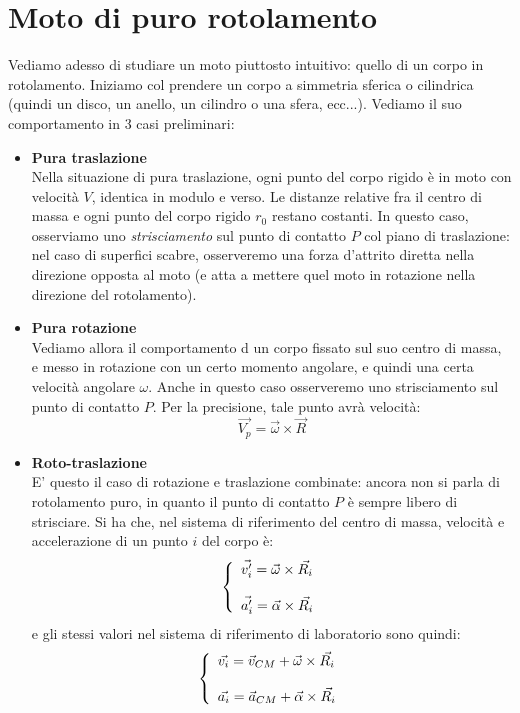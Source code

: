 \documentclass[a4paper,12pt]{article}
\begin{document}
\section{Moto di puro rotolamento}
Vediamo adesso di studiare un moto piuttosto intuitivo: quello di un corpo in rotolamento. Iniziamo col prendere un corpo a simmetria sferica o cilindrica (quindi un disco, un anello, un cilindro o una sfera, ecc...). Vediamo il suo comportamento in 3 casi preliminari:
\begin{itemize}
  \item \textbf{Pura traslazione} \\
    Nella situazione di pura traslazione, ogni punto del corpo rigido è in moto con velocità $V$, identica in modulo e verso. Le distanze relative fra il centro di massa e ogni punto del corpo rigido $r_0$ restano costanti. In questo caso,
    osserviamo uno \textit{strisciamento} sul punto di contatto $P$ col piano di traslazione: nel caso di superfici scabre, osserveremo una forza d'attrito diretta nella direzione opposta al moto (e atta a mettere quel moto in rotazione nella direzione del rotolamento).
  \item \textbf{Pura rotazione} \\
    Vediamo allora il comportamento d un corpo fissato sul suo centro di massa, e messo in rotazione con un certo momento angolare, e quindi una certa velocità angolare $\omega$. Anche in questo caso osserveremo uno strisciamento sul punto di contatto $P$. Per la precisione,
    tale punto avrà velocità:
    $$ \vec{V_p} = \vec{\omega} \times \vec{R} $$
  \item \textbf{Roto-traslazione} \\
    E' questo il caso di rotazione e traslazione combinate: ancora non si parla di rotolamento puro, in quanto il punto di contatto $P$ è sempre libero di strisciare. Si ha che, nel sistema di riferimento del centro di massa,
    velocità e accelerazione di un punto $i$ del corpo è:
    $$ 
    \left\{\begin{array}{l}
        \vec{v'_i} = \vec{\omega} \times \vec{R_i} \cr \\ 
        \vec{a'_i} = \vec{\alpha} \times \vec{R_i}
    \end{array}\right.
    $$
    e gli stessi valori nel sistema di riferimento di laboratorio sono quindi:
    $$ 
    \left\{\begin{array}{l}
        \vec{v_i} = \vec{v}_{CM} + \vec{\omega} \times \vec{R_i} \cr \\ 
        \vec{a_i} = \vec{a}_{CM} + \vec{\alpha} \times \vec{R_i}
    \end{array}\right.
    $$
\end{itemize}
\end{document}
